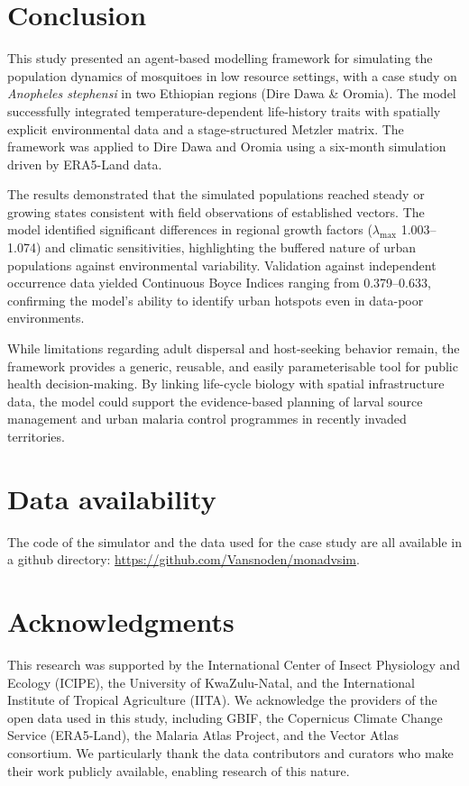 \documentclass{article}
\begin{document}
\section{Conclusion}
\label{sec:conclusion}
This study presented an agent-based modelling framework for simulating the population dynamics of mosquitoes in low resource settings,
with a case study on \textit{Anopheles stephensi} in two Ethiopian regions (Dire Dawa & Oromia). The model successfully integrated 
temperature-dependent life-history traits with spatially explicit environmental data and a stage-structured Metzler matrix. The framework was applied 
to Dire Dawa and Oromia using a six-month simulation driven by ERA5-Land data. 
\par
The results demonstrated that the simulated populations reached steady or growing states consistent with field observations of established 
vectors. The model identified significant differences in regional growth factors ($\lambda_{\max}$ \numrange{1.003}{1.074}) and climatic 
sensitivities, highlighting the buffered nature of urban populations against environmental variability. Validation against independent 
occurrence data yielded Continuous Boyce Indices ranging from \numrange{0.379}{0.633}, confirming the model's ability to identify urban 
hotspots even in data-poor environments.
\par
While limitations regarding adult dispersal and host-seeking behavior remain, the framework provides a generic, reusable, and easily 
parameterisable tool for public health decision-making. By linking life-cycle biology with spatial infrastructure data, the model could
support the evidence-based planning of larval source management and urban malaria control programmes in recently invaded territories.


\section*{Data availability}
The code of the simulator and the data used for the case study are all available in a github directory:
\url{https://github.com/Vansnoden/monadvsim}.


\section*{Acknowledgments}
\par
This research was supported by the International Center of Insect Physiology and Ecology (ICIPE), 
the University of KwaZulu-Natal, and the International Institute of Tropical Agriculture (IITA). 
We acknowledge the providers of the open data used in this study, including GBIF, the Copernicus 
Climate Change Service (ERA5-Land), the Malaria Atlas Project, and the Vector Atlas consortium. 
We particularly thank the data contributors and curators who make their work publicly available, 
enabling research of this nature.




\end{document}
